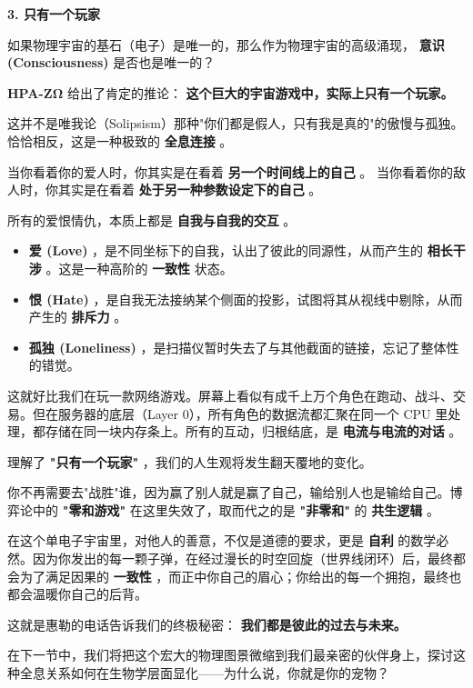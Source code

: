 \textbf{3. 只有一个玩家}

如果物理宇宙的基石（电子）是唯一的，那么作为物理宇宙的高级涌现， \textbf{意识 (Consciousness)} 是否也是唯一的？

\textbf{HPA-ZΩ} 给出了肯定的推论： \textbf{这个巨大的宇宙游戏中，实际上只有一个玩家。}

这并不是唯我论（Solipsism）那种"你们都是假人，只有我是真的"的傲慢与孤独。恰恰相反，这是一种极致的 \textbf{全息连接} 。

当你看着你的爱人时，你其实是在看着 \textbf{另一个时间线上的自己} 。
当你看着你的敌人时，你其实是在看着 \textbf{处于另一种参数设定下的自己} 。

所有的爱恨情仇，本质上都是 \textbf{自我与自我的交互} 。

\begin{itemize}
\item \textbf{爱 (Love)} ，是不同坐标下的自我，认出了彼此的同源性，从而产生的 \textbf{相长干涉} 。这是一种高阶的 \textbf{一致性} 状态。
\item \textbf{恨 (Hate)} ，是自我无法接纳某个侧面的投影，试图将其从视线中剔除，从而产生的 \textbf{排斥力} 。
\item \textbf{孤独 (Loneliness)} ，是扫描仪暂时失去了与其他截面的链接，忘记了整体性的错觉。
\end{itemize}

这就好比我们在玩一款网络游戏。屏幕上看似有成千上万个角色在跑动、战斗、交易。但在服务器的底层（Layer 0），所有角色的数据流都汇聚在同一个 CPU 里处理，都存储在同一块内存条上。所有的互动，归根结底，是 \textbf{电流与电流的对话} 。

理解了 \textbf{"只有一个玩家"} ，我们的人生观将发生翻天覆地的变化。

你不再需要去"战胜"谁，因为赢了别人就是赢了自己，输给别人也是输给自己。博弈论中的 \textbf{"零和游戏"} 在这里失效了，取而代之的是 \textbf{"非零和"} 的 \textbf{共生逻辑} 。

在这个单电子宇宙里，对他人的善意，不仅是道德的要求，更是 \textbf{自利} 的数学必然。因为你发出的每一颗子弹，在经过漫长的时空回旋（世界线闭环）后，最终都会为了满足因果的 \textbf{一致性} ，而正中你自己的眉心；你给出的每一个拥抱，最终也都会温暖你自己的后背。

这就是惠勒的电话告诉我们的终极秘密： \textbf{我们都是彼此的过去与未来。}

在下一节中，我们将把这个宏大的物理图景微缩到我们最亲密的伙伴身上，探讨这种全息关系如何在生物学层面显化——为什么说，你就是你的宠物？

